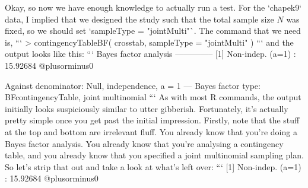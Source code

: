 Okay, so now we have enough knowledge to actually run a test. For the `chapek9` data, I implied that we designed the study such that the total sample size $N$ was fixed, so we should set `sampleType = "jointMulti"`. The command that we need is,
```
> contingencyTableBF( crosstab, sampleType = "jointMulti" )
```
and the output looks like this:
```
Bayes factor analysis
--------------
[1] Non-indep. (a=1) : 15.92684 @plusorminus0%

Against denominator:
  Null, independence, a = 1 
---
Bayes factor type: BFcontingencyTable, joint multinomial
```
As with most R commands, the output initially looks suspiciously similar to utter gibberish. Fortunately, it's actually pretty simple once you get past the initial impression. Firstly, note that the stuff at the top and bottom are irrelevant fluff. You already know that you're doing a Bayes factor analysis. You already know that you're analysing a contingency table, and you already know that you specified a joint multinomial sampling plan. So let's strip that out and take a look at what's left over:
``` 
[1] Non-indep. (a=1) : 15.92684 @plusorminus0%

